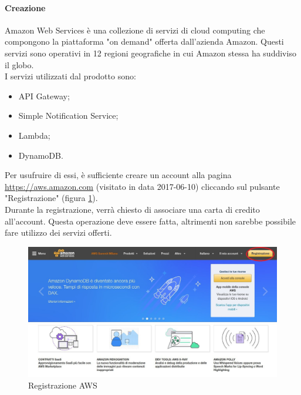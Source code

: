 \paragraph{Creazione}
Amazon Web Services è una collezione di servizi di cloud computing che compongono la piattaforma "on demand" offerta dall'azienda Amazon. Questi servizi sono operativi in 12 regioni geografiche in cui Amazon stessa ha suddiviso il globo.\\
I servizi utilizzati dal prodotto sono:
\begin{itemize}
	\item API Gateway;
	\item Simple Notification Service;
	\item Lambda;
	\item DynamoDB.
\end{itemize}
Per usufruire di essi, è sufficiente creare un account alla pagina \url{https://aws.amazon.com} (visitato in data 2017-06-10) cliccando sul pulsante "Registrazione" (figura \ref{fig:aws}). \\
Durante la registrazione, verrà chiesto di associare una carta di credito all'account. Questa operazione deve essere fatta, altrimenti non sarebbe possibile fare utilizzo dei servizi offerti.
\begin{figure}[h]
\includegraphics[width=\textwidth,height=\textheight,keepaspectratio]{sezioni/images/aws.jpg}
\caption{Registrazione AWS}\label{fig:aws}
\end{figure}
\newpage

